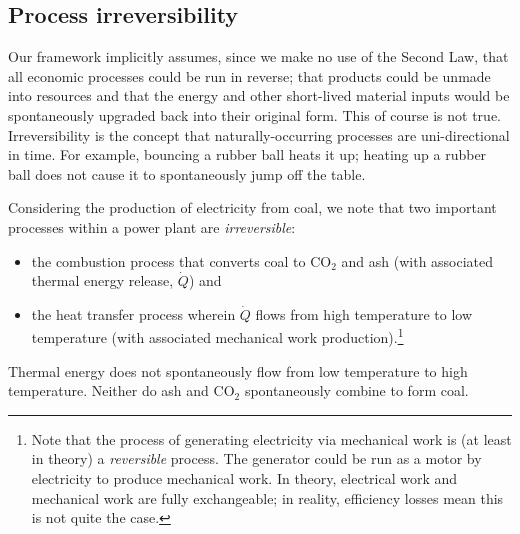 

\subsection{Process irreversibility}
\label{sec:irreversibility}
Our framework implicitly assumes, 
since we make no use of the Second Law,
that all economic processes could be run in reverse;
that products could be unmade into resources
and that the energy and other short-lived material
inputs would be spontaneously upgraded back into their
original form.
This of course is not true.
Irreversibility is the concept that naturally-occurring processes 
are uni-directional in time.
For example, 
bouncing a rubber ball heats it up;
heating up a rubber ball does not cause it to
spontaneously jump off the table.

Considering the production of electricity from coal,
we note that two important processes within a power plant are \emph{irreversible}:

\begin{itemize}
	\item{the combustion process that converts coal to CO$_{2}$ and ash 
	(with associated thermal energy release, $\dot{Q}$) and}
	
	\item{the heat transfer process wherein $\dot{Q}$ flows 
	from high temperature to low temperature (with associated 
	mechanical work production).\footnote{Note 
		that the process of generating
		electricity via mechanical work is (at least in theory) a
		\emph{reversible} process.
		The generator could be run as a motor by electricity to produce
		mechanical work.
		In theory,
		electrical work and mechanical work are fully exchangeable;
		in reality, efficiency losses mean this is not quite the case.}}
\end{itemize}

\noindent{}Thermal energy does not spontaneously flow from low temperature to high temperature.
Neither do ash and CO$_{2}$ spontaneously combine to form coal.

